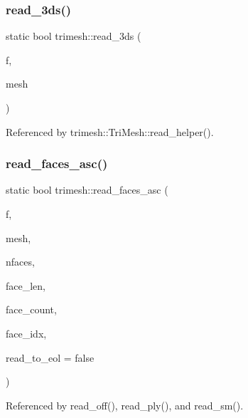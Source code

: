 \mbox{\label{namespacetrimesh_af87e720574f2b83f4a1f8cb94231d676}} 
\subsubsection{\texorpdfstring{read\+\_\+3ds()}{read\_3ds()}}
{\footnotesize\ttfamily static bool trimesh\+::read\+\_\+3ds (\begin{DoxyParamCaption}\item[{F\+I\+LE $\ast$}]{f,  }\item[{\hyperlink{classtrimesh_1_1TriMesh}{Tri\+Mesh} $\ast$}]{mesh }\end{DoxyParamCaption})\hspace{0.3cm}{\ttfamily [static]}}



Referenced by trimesh\+::\+Tri\+Mesh\+::read\+\_\+helper().

\mbox{\label{namespacetrimesh_a4ee83266cd4402cfd9c77ae4b3b53b8c}} 
\subsubsection{\texorpdfstring{read\+\_\+faces\+\_\+asc()}{read\_faces\_asc()}}
{\footnotesize\ttfamily static bool trimesh\+::read\+\_\+faces\+\_\+asc (\begin{DoxyParamCaption}\item[{F\+I\+LE $\ast$}]{f,  }\item[{\hyperlink{classtrimesh_1_1TriMesh}{Tri\+Mesh} $\ast$}]{mesh,  }\item[{int}]{nfaces,  }\item[{int}]{face\+\_\+len,  }\item[{int}]{face\+\_\+count,  }\item[{int}]{face\+\_\+idx,  }\item[{bool}]{read\+\_\+to\+\_\+eol = {\ttfamily false} }\end{DoxyParamCaption})\hspace{0.3cm}{\ttfamily [static]}}



Referenced by read\+\_\+off(), read\+\_\+ply(), and read\+\_\+sm().

